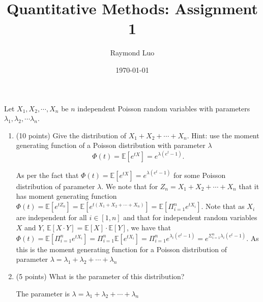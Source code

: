 \documentclass[12pt,twoside, letter]{exam}
\theoremstyle{definition}
\begin{document}
\abovedisplayskip=12pt
\belowdisplayskip=12pt
\abovedisplayshortskip=7pt
\belowdisplayshortskip=10pt
\allowdisplaybreaks

\setlength{\parindent}{18pt}

\title{Quantitative Methods: Assignment 1}
\author{Raymond Luo}
\date{\today}
\maketitle



Let $X_1, X_2, \cdots, X_n$ be $n$ independent Poisson random variables with parameters $\lambda_1,\lambda_2,\cdots\lambda_n$.

\begin{enumerate}
\item (10 points) Give the distribution of $X_1+X_2+\cdots+X_n$. Hint:  use the moment generating function of a Poisson distribution with parameter $\lambda$
\[\Phi(t)=\mathbb{E}[e^{tX}]=e^{\lambda(e^t-1)}.\]
  \begin{solution}
    As per the fact that $\Phi(t)=\mathbb{E}[e^{tX}]=e^{\lambda(e^t-1)}$ for some Poisson distribution of parameter $\lambda$. We note that for $Z_{n} = X_1 + X_2 + \cdots + X_n$ that it has moment generating function
    $\Phi(t) = \mathbb{E}[e^{tZ_n}] = \mathbb{E}[e^{t(X_1 + X_2 + \cdots + X_n)}] = \mathbb{E}[\Pi^n_{i=1} e^{tX_i}]$. Note that as $X_{i}$ are independent for all $i \in [1,n]$ and that for independent random variables $X$ and $Y$,
    $\mathbb{E}[X \cdot Y] = \mathbb{E}[X] \cdot \mathbb{E}[Y]$,
    we have that \\
    $\Phi(t) = \mathbb{E}[\Pi^n_{i=1} e^{tX_i}] = \Pi^n_{i=1} \mathbb{E}[e^{tX_i}] = \Pi^n_{i=1} e^{\lambda_{i}(e^t-1)} = e^{\Sigma^{n}_{i=1} \lambda_{i}(e^t-1)}$. As this is
    the moment generating function for a Poisson distribution of parameter $\lambda = \lambda_{1} + \lambda_{2} + \cdots + \lambda_{n}$
  \end{solution}
\item (5 points) What is the parameter of this distribution?
  \begin{solution}
    The parameter is $\lambda = \lambda_{1} + \lambda_{2} + \cdots + \lambda_{n}$
  \end{solution}
\end{enumerate}

\bigskip

\end{document}
